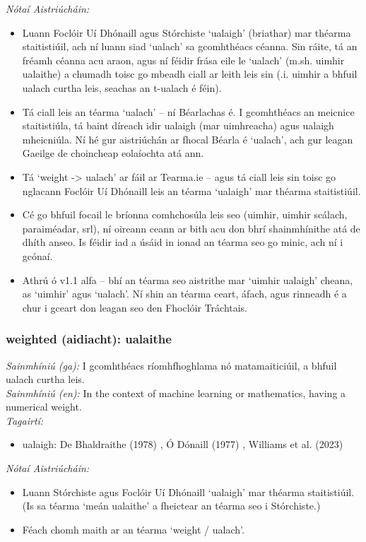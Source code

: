  \noindent \textit{Nótaí Aistriúcháin:}
\begin{itemize}
	\item Luann Foclóir Uí Dhónaill agus Stórchiste `ualaigh' (briathar) mar théarma staitistiúil, ach ní luann siad `ualach' sa gcomhthéacs céanna. Sin ráite, tá an fréamh céanna acu araon, agus ní féidir frása eile le `ualach' (m.sh. uimhir ualaithe) a chumadh toisc go mbeadh ciall ar leith leis sin (.i. uimhir a bhfuil ualach curtha leis, seachas an t-ualach é féin).
	\item Tá ciall leis an téarma `ualach' -- ní Béarlachas é. I gcomhthéacs an meicnice staitistiúla, tá baint díreach idir ualaigh (mar uimhreacha) agus ualaigh mheicniúla. Ní hé gur aistriúchán ar fhocal Béarla é `ualach', ach gur leagan Gaeilge de choincheap eolaíochta atá ann.
	\item Tá `weight -> ualach' ar fáil ar Tearma.ie -- agus tá ciall leis sin toisc go nglacann Foclóir Uí Dhónaill leis an téarma `ualaigh' mar théarma staitistiúil. 
	\item Cé go bhfuil focail le bríonna comhchosúla leis seo (uimhir, uimhir scálach, paraiméadar, srl), ní oireann ceann ar bith acu don bhrí shainmhínithe atá de dhíth anseo. Is féidir iad a úsáid in ionad an téarma seo go minic, ach ní i gcónaí.
	\item Athrú ó v1.1 alfa -- bhí an téarma seo aistrithe mar `uimhir ualaigh' cheana, as `uimhir' agus `ualach'. Ní shin an téarma ceart, áfach, agus rinneadh é a chur i gceart don leagan seo den Fhoclóir Tráchtais.
\end{itemize}


\subsubsection*{weighted (aidiacht): ualaithe}
 \noindent \textit{Sainmhíniú (ga):} I gcomhthéacs ríomhfhoghlama nó matamaiticiúil, a bhfuil ualach curtha leis.
\\
 \noindent \textit{Sainmhíniú (en):} In the context of machine learning or mathematics, having a numerical weight.
\\
 \noindent \textit{Tagairtí:}
\begin{itemize}
	\item ualaigh: De Bhaldraithe (1978) \cite{de-bhaldraithe}, Ó Dónaill (1977) \cite{odonaill}, Williams et al. (2023) \cite{storchiste}
\end{itemize}

 \noindent \textit{Nótaí Aistriúcháin:}
\begin{itemize}
	\item Luann Stórchiste agus Foclóir Uí Dhónaill `ualaigh' mar théarma staitistiúil. (Is sa téarma `meán ualaithe' a fheictear an téarma seo i Stórchiste.)
	\item Féach chomh maith ar an téarma `weight / ualach'.
\end{itemize}



